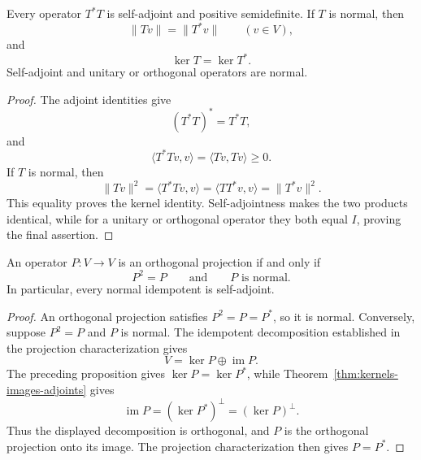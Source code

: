 \begin{proposition}
Every operator \(T^*T\) is self-adjoint and positive semidefinite. If \(T\) is normal,
then
\[
\lVert Tv\rVert=\lVert T^*v\rVert
\qquad(v\in V),
\]
and
\[
\ker T=\ker T^*.
\]
Self-adjoint and unitary or orthogonal operators are normal.
\end{proposition}
\begin{proof}
The adjoint identities give
\[
(T^*T)^*=T^*T,
\]
and
\[
\langle T^*Tv,v\rangle=\langle Tv,Tv\rangle\geq0.
\]
If \(T\) is normal, then
\[
\lVert Tv\rVert^2
=\langle T^*Tv,v\rangle
=\langle TT^*v,v\rangle
=\lVert T^*v\rVert^2.
\]
This equality proves the kernel identity. Self-adjointness makes the two
products identical, while for a unitary or orthogonal operator they both
equal \(I\), proving the final assertion.
\end{proof}

\begin{corollary}
\label{cor:normal-idempotent-projection}
An operator \(P:V\to V\) is an orthogonal projection if and only if
\[
P^2=P\qquad\text{and}\qquad P\text{ is normal}.
\]
In particular, every normal idempotent is self-adjoint.
\end{corollary}
\begin{proof}
An orthogonal projection satisfies \(P^2=P=P^*\), so it is normal.
Conversely, suppose \(P^2=P\) and \(P\) is normal. The idempotent
decomposition established in the projection characterization gives
\[
V=\ker P\oplus\operatorname{im}P.
\]
The preceding proposition gives \(\ker P=\ker P^*\), while
Theorem~\ref{thm:kernels-images-adjoints} gives
\[
\operatorname{im}P=(\ker P^*)^\perp=(\ker P)^\perp.
\]
Thus the displayed decomposition is orthogonal, and \(P\) is the orthogonal
projection onto its image. The projection characterization then gives
\(P=P^*\).
\end{proof}


